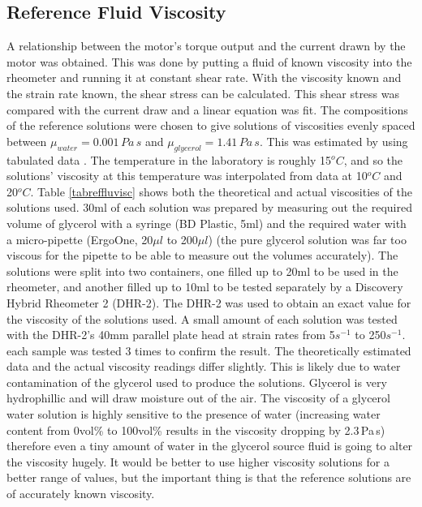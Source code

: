 \documentclass[twoside,a4]{report}
\def\br{\newline \newline \noindent}
\begin{document}
	\subsection*{Reference Fluid Viscosity}
	A relationship between the motor's torque output and the current drawn by the motor was obtained. This was done by putting a fluid of known viscosity into the rheometer and running it at constant shear rate. With the viscosity known and the strain rate known, the shear stress can be calculated. This shear stress was compared with the current draw and a linear equation was fit. 
	\br
	The compositions of the reference solutions were chosen to give solutions of viscosities evenly spaced between $\mu_{water} = 0.001\,Pa\,s$ and $\mu_{glycerol} = 1.41\,Pa\,s$. This was estimated by using tabulated data \cite{seguroberglycsolvisc}. The temperature in the laboratory is roughly 15$^oC$, and so the solutions' viscosity at this temperature was interpolated from data at 10$^oC$ and 20$^oC$. Table \ref{tabreffluvisc} shows both the theoretical and actual viscosities of the solutions used. 30ml of each solution was prepared by measuring out the required volume of glycerol with a syringe (BD Plastic, 5ml) and the required water with a micro-pipette (ErgoOne, 20$\mu l$ to 200$\mu l$) (the pure glycerol solution was far too viscous for the pipette to be able to measure out the volumes accurately). The solutions were split into two containers, one filled up to 20ml to be used in the rheometer, and another filled up to 10ml to be tested separately by a Discovery Hybrid Rheometer 2 (DHR-2). 
	\br
	The DHR-2 was used to obtain an exact value for the viscosity of the solutions used. A small amount of each solution was tested with the DHR-2's 40mm parallel plate head at strain rates from 5$s^{-1}$ to 250$s^{-1}$. each sample was tested 3 times to confirm the result. The theoretically estimated data and the actual viscosity readings differ slightly. This is likely due to water contamination of the glycerol used to produce the solutions. Glycerol is very hydrophillic and will draw moisture out of the air. The viscosity of a glycerol water solution is highly sensitive to the presence of water (increasing water content from 0vol\% to 100vol\% results in the viscosity dropping by 2.3\,Pa\,s) therefore even a tiny amount of water in the glycerol source fluid is going to alter the viscosity hugely. It would be better to use higher viscosity solutions for a better range of values, but the important thing is that the reference solutions are of accurately known viscosity. 
	\newline
\end{document}
